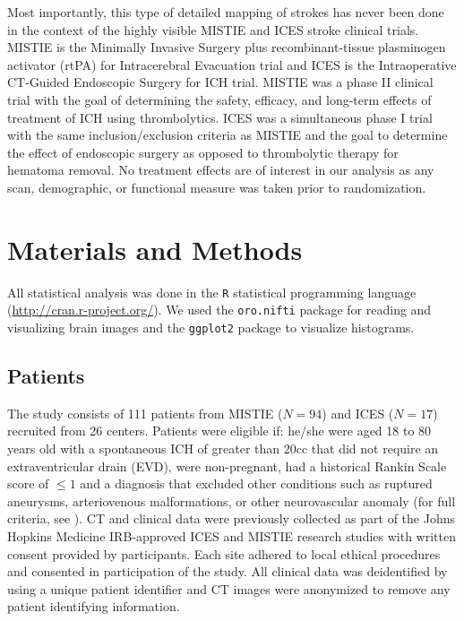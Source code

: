 \documentclass[10pt]{article}\usepackage[]{graphicx}\usepackage[]{color}
\begin{document}
Most importantly, this type of detailed mapping of strokes has never been done in the context of the highly visible MISTIE and ICES stroke clinical trials. MISTIE is the Minimally Invasive Surgery plus recombinant-tissue plasminogen activator (rtPA) for Intracerebral Evacuation trial and ICES is the Intraoperative CT-Guided Endoscopic Surgery for ICH trial.  MISTIE was a phase II clinical trial with the goal of determining the safety, efficacy, and long-term effects of treatment of ICH using thrombolytics.  ICES was a simultaneous phase I trial with the same inclusion/exclusion criteria as MISTIE and the goal to determine the effect of endoscopic surgery as opposed to thrombolytic therapy for hematoma removal.  
No treatment effects are of interest in our analysis as any scan, demographic, or functional measure was taken prior to randomization. 

\section*{Materials and Methods}

All statistical analysis was done in the \verb|R| statistical programming language (\url{http://cran.r-project.org/}).  We used the \verb|oro.nifti| package \citep{whitcher_working_2011} for reading and visualizing brain images and the \verb|ggplot2| package \citep{wickham_ggplot2:_2009} to visualize histograms.

\subsection*{Patients}
The study consists of 111 patients from MISTIE ($N=94$) and ICES ($N = 17$) recruited from 26 centers.  Patients were eligible if: he/she were aged 18 to 80 years old with a spontaneous ICH of greater than $20$cc that did not require an extraventricular drain (EVD), were non-pregnant, had a historical Rankin Scale \citep{rankin_cerebral_1957, swieten_interobserver_1988} score of $≤ 1$ and a diagnosis that excluded other conditions such as ruptured aneurysms, arteriovenous malformations, or other neurovascular anomaly (for full criteria, see \citet{mould_minimally_2013}).  CT and clinical data were previously collected as part of the Johns Hopkins Medicine IRB-approved ICES and MISTIE research studies with written consent provided by participants.  Each site adhered to local ethical procedures and consented in participation of the study.  All clinical data was deidentified by using a unique patient identifier and CT images were anonymized to remove any patient identifying information.  
\end{document}
